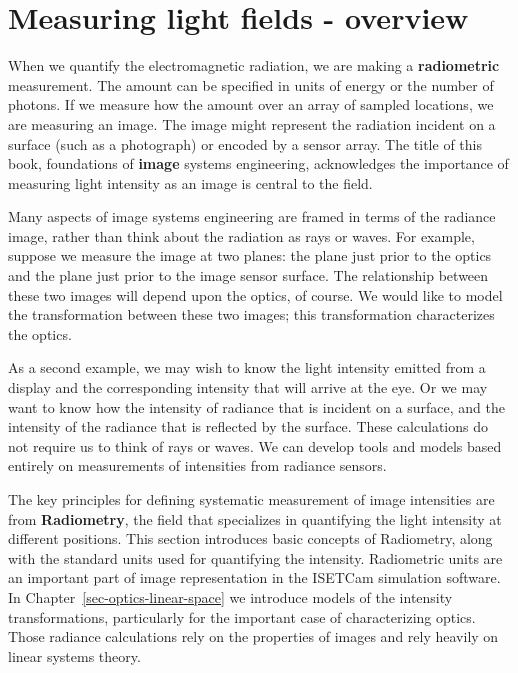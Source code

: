 \documentclass[
  letterpaper,
]{book}
\begin{document}
\section{Measuring light fields -
overview}\label{measuring-light-fields---overview}

When we quantify the electromagnetic radiation, we are making a
\textbf{radiometric} measurement. The amount can be specified in units
of energy or the number of photons. If we measure how the amount over an
array of sampled locations, we are measuring an image. The image might
represent the radiation incident on a surface (such as a photograph) or
encoded by a sensor array. The title of this book, foundations of
\textbf{image} systems engineering, acknowledges the importance of
measuring light intensity as an image is central to the field.

Many aspects of image systems engineering are framed in terms of the
radiance image, rather than think about the radiation as rays or waves.
For example, suppose we measure the image at two planes: the plane just
prior to the optics and the plane just prior to the image sensor
surface. The relationship between these two images will depend upon the
optics, of course. We would like to model the transformation between
these two images; this transformation characterizes the optics.

As a second example, we may wish to know the light intensity emitted
from a display and the corresponding intensity that will arrive at the
eye. Or we may want to know how the intensity of radiance that is
incident on a surface, and the intensity of the radiance that is
reflected by the surface. These calculations do not require us to think
of rays or waves. We can develop tools and models based entirely on
measurements of intensities from radiance sensors.

The key principles for defining systematic measurement of image
intensities are from \textbf{Radiometry}, the field that specializes in
quantifying the light intensity at different positions. This section
introduces basic concepts of Radiometry, along with the standard units
used for quantifying the intensity. Radiometric units are an important
part of image representation in the ISETCam simulation software. In
Chapter~\ref{sec-optics-linear-space} we introduce models of the
intensity transformations, particularly for the important case of
characterizing optics. Those radiance calculations rely on the
properties of images and rely heavily on linear systems theory.
\end{document}
